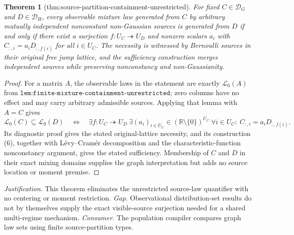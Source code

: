 \documentclass{article}
\newtheorem{theorem}{Theorem}
\begin{document}
\begin{theorem}[thm:source-partition-containment-unrestricted]\label{thm:source-partition-containment-unrestricted}
For fixed \(C\in\mathcal D_G\) and \(D\in\mathcal D_H\), every observable mixture law generated from \(C\) by arbitrary mutually independent nonconstant non-Gaussian sources is generated from \(D\) if and only if there exist a surjection \(f:U_C\twoheadrightarrow U_D\) and nonzero scalars \(a_i\) with \(C_{:,i}=a_iD_{:,f(i)}\) for all \(i\in U_C\). The necessity is witnessed by Bernoulli sources in their original free jump lattice, and the sufficiency construction merges independent sources while preserving nonconstancy and non-Gaussianity.
\end{theorem}
\begin{proof}
For a matrix \(A\), the observable laws in the statement are exactly \(\mathscr L_0(A)\) from \(\texttt{lem:finite-mixture-containment-unrestricted}\); zero columns have no effect and may carry arbitrary admissible sources. Applying that lemma with \(A=C\) gives
\[
\mathscr L_0(C)\subseteq\mathscr L_0(D)
\quad\Longleftrightarrow\quad
\exists f:U_C\twoheadrightarrow U_D\ \exists(a_i)_{i\in U_C}\in(\mathbb R\setminus\{0\})^{U_C}\ 
\forall i\in U_C:\ C_{:,i}=a_iD_{:,f(i)}.
\]
Its diagnostic proof gives the stated original-lattice necessity, and its construction (6), together with L\'evy--Cram\'er decomposition and the characteristic-function nonconstancy argument, gives the stated sufficiency. Membership of \(C\) and \(D\) in their exact mixing domains supplies the graph interpretation but adds no source location or moment premise.
\end{proof}
\par\smallskip\noindent \textit{Justification.} This theorem eliminates the unrestricted source-law quantifier with no centering or moment restriction. \textit{Gap.} Observational distribution-set results do not by themselves supply the exact visible-source surjection needed for a shared multi-regime mechanism. \textit{Consumer.} The population compiler compares graph law sets using finite source-partition types.
\end{document}
